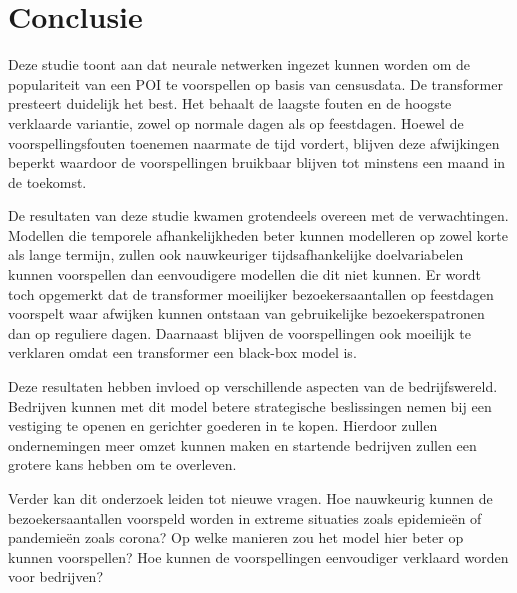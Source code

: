 
\chapter{Conclusie}%
\label{ch:conclusie}



Deze studie toont aan dat neurale netwerken ingezet kunnen worden om de populariteit van een POI te voorspellen op basis van censusdata. De transformer presteert duidelijk het best. Het behaalt de laagste fouten en de hoogste verklaarde variantie, zowel op normale dagen als op feestdagen. Hoewel de voorspellingsfouten toenemen naarmate de tijd vordert, blijven deze afwijkingen beperkt waardoor de voorspellingen bruikbaar blijven tot minstens een maand in de toekomst.

De resultaten van deze studie kwamen grotendeels overeen met de verwachtingen. Modellen die temporele afhankelijkheden beter kunnen modelleren op zowel korte als lange termijn, zullen ook nauwkeuriger tijdsafhankelijke doelvariabelen kunnen voorspellen dan eenvoudigere modellen die dit niet kunnen. Er wordt toch opgemerkt dat de transformer moeilijker bezoekersaantallen op feestdagen voorspelt waar afwijken kunnen ontstaan van gebruikelijke bezoekerspatronen dan op reguliere dagen. Daarnaast blijven de voorspellingen ook moeilijk te verklaren omdat een transformer een black-box model is.

Deze resultaten hebben invloed op verschillende aspecten van de bedrijfswereld. Bedrijven kunnen met dit model betere strategische beslissingen nemen bij een vestiging te openen en gerichter goederen in te kopen. Hierdoor zullen ondernemingen meer omzet kunnen maken en startende bedrijven zullen een grotere kans hebben om te overleven.

Verder kan dit onderzoek leiden tot nieuwe vragen. Hoe nauwkeurig kunnen de bezoekersaantallen voorspeld worden in extreme situaties zoals epidemieën of pandemieën zoals corona? Op welke manieren zou het model hier beter op kunnen voorspellen? Hoe kunnen de voorspellingen eenvoudiger verklaard worden voor bedrijven?
